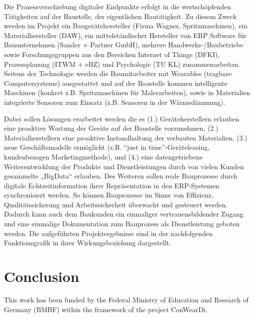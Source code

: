 

Die Prozessverschiebung digitaler Endpunkte erfolgt in die wertschöpfenden Tätigkeiten auf der Baustelle, der eigentlichen Bautätigkeit. Zu diesem Zweck werden im Projekt ein Baugerätehersteller (Firma Wagner, Spritzmaschinen), ein Materialhersteller (DAW), ein mittelständischer Hersteller von ERP Software für Bauunternehmen (Sander + Partner GmbH), mehrere Handwerks-/Baubetriebe sowie Forschungsgruppen aus den Bereichen Internet of Things (DFKI), Prozessplanung (ITWM + eBZ) und Psychologie (TU KL) zusammenarbeiten. Seitens der Technologie werden die Baumitarbeiter mit Wearables (tragbare Computersysteme) ausgestattet und auf der Baustelle kommen intelligente Maschinen (konkret z.B. Spritzmaschinen für Malerarbeiten), sowie in Materialien integrierte Sensoren zum Einsatz (z.B. Sensoren in der Wärmedämmung).

Dabei sollen Lösungen erarbeitet werden die es (1.) Geräteherstellern erlauben eine proaktive Wartung der Geräte auf der Baustelle vorzunehmen, (2.) Materialherstellern eine proaktive Instandhaltung der verbauten Materialien, (3.) neue Geschäftsmodelle ermöglicht (z.B. “just in time”-Geräteleasing, kundenbezogen Marketingmethode), und (4.) eine datengetriebene Weiterentwicklung der Produkte und Dienstleistungen durch von vielen Kunden gesammelte „BigData“ erlauben. Des Weiteren sollen reale Bauprozesse durch digitale Echtzeitinformation ihrer Repräsentation in den ERP-Systemen synchronisiert werden. So können Bauprozesse im Sinne von Effizienz, Qualitätssicherung und Arbeitssicherheit überwacht und gesteuert werden. Dadurch kann auch dem Baukunden ein einmaliger vertrauensbildender Zugang und eine einmalige Dokumentation zum Bauprozess als Dienstleistung geboten werden.
Die aufgeführten Projektergebnisse sind in der nachfolgenden Funktionsgrafik in ihrer Wirkungsbeziehung dargestellt.


\section{Conclusion}


\begin{acks}
  This work has been funded by the Federal Ministry of Education and Research of Germany (BMBF) within the framework of the project ConWearDi.
\end{acks}
